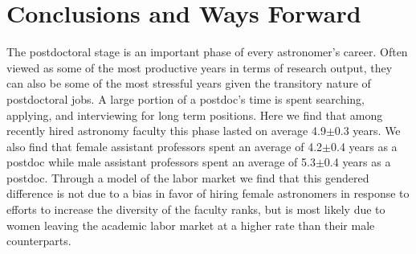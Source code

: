 \documentclass[modern]{aastex62}
\begin{document}

\section{Conclusions and Ways Forward}
The postdoctoral stage is an important phase of every astronomer's career. Often viewed as some of the most productive years in terms of research output, they can also be some of the most stressful years given the transitory nature of postdoctoral jobs. A large portion of a postdoc's time is spent searching, applying, and interviewing for long term positions. Here we find that among recently hired astronomy faculty this phase lasted on average 4.9$\pm$0.3 years. We also find that female assistant professors spent an average of 4.2$\pm$0.4 years as a postdoc while male assistant professors spent an average of 5.3$\pm$0.4 years as a postdoc. Through a model of the labor market we find that this gendered difference is not due to a bias in favor of hiring female astronomers in response to efforts to increase the diversity of the faculty ranks, but is most likely due to women leaving the academic labor market at a higher rate than their male counterparts. 
\end{document}
